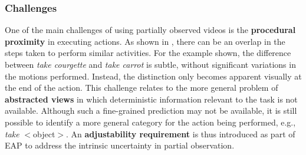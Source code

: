 \subsubsection{Challenges}

One of the main challenges of using partially observed videos is the \textbf{procedural proximity} in executing actions. As shown in , there can be an overlap in the steps taken to perform similar activities. For the example shown, the difference between \textit{take courgette} and \textit{take carrot} is subtle, without significant variations in the motions performed. Instead, the distinction only becomes apparent visually at the end of the action. This challenge relates to the more general problem of \textbf{abstracted views} in which deterministic information relevant to the task is not available. Although such a fine-grained prediction may not be available, it is still possible to identify a more general category for the action being performed, e.g., \textit{take} $<$object$>$. An \textbf{adjustability requirement} is thus introduced as part of EAP to address the intrinsic uncertainty in partial observation.


